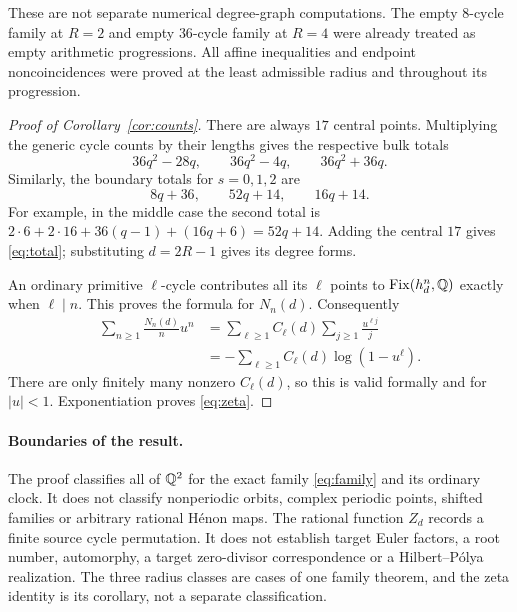 These are not separate numerical degree-graph computations. The
empty $8$-cycle family at $R=2$ and empty $36$-cycle family at
$R=4$ were already treated as empty arithmetic progressions.
All affine inequalities and endpoint noncoincidences were proved
at the least admissible radius and throughout its progression.

\begin{proof}[Proof of Corollary~\ref{cor:counts}]
There are always $17$ central points. Multiplying the generic
cycle counts by their lengths gives the respective bulk totals
\[
 36q^2-28q,\qquad 36q^2-4q,\qquad 36q^2+36q.
\]
Similarly, the boundary totals for $s=0,1,2$ are
\[
 8q+36,\qquad 52q+14,\qquad 16q+14.
\]
For example, in the middle case the second total is
$2\cdot6+2\cdot16+36(q-1)+(16q+6)=52q+14$.
Adding the central $17$ gives \eqref{eq:total}; substituting
$d=2R-1$ gives its degree forms.

An ordinary primitive $\ell$-cycle contributes all its $\ell$
points to $\operatorname{Fix}(h_d^n,\mathbb Q)$ exactly when $\ell\mid n$.
This proves the formula for $N_n(d)$. Consequently
\begin{align*}
 \sum_{n\ge1}\frac{N_n(d)}n u^n
 &=\sum_{\ell\ge1} C_\ell(d)\sum_{j\ge1}\frac{u^{\ell j}}j\\
 &=-\sum_{\ell\ge1}C_\ell(d)\log(1-u^\ell).
\end{align*}
There are only finitely many nonzero $C_\ell(d)$, so this is
valid formally and for $|u|<1$. Exponentiation proves
\eqref{eq:zeta}.
\end{proof}

\paragraph{Boundaries of the result.}
The proof classifies all of $\mathbb Q^2$ for the exact family
\eqref{eq:family} and its ordinary clock. It does not classify
nonperiodic orbits, complex periodic points, shifted families or
arbitrary rational H\'enon maps. The rational function $Z_d$
records a finite source cycle permutation. It does not establish
target Euler factors, a root number, automorphy, a target
zero-divisor correspondence or a Hilbert--P\'olya realization.
The three radius classes are cases of one family theorem, and
the zeta identity is its corollary, not a separate classification.
